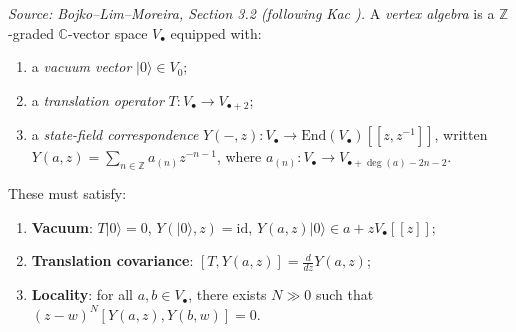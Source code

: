 
\begin{definition}[VertexAlgebra]
  \label{def:vertex-algebra}
  \textit{Source: Bojko--Lim--Moreira, Section 3.2 (following Kac \cite{Ka98}).}
  A \emph{vertex algebra} is a \(\mathbb{Z}\)-graded \(\mathbb{C}\)-vector space
  \(V_\bullet\) equipped with:
  \begin{enumerate}
  \item a \emph{vacuum vector} \(|0\rangle \in V_0\);
  \item a \emph{translation operator} \(T \colon V_\bullet \to V_{\bullet+2}\);
  \item a \emph{state-field correspondence}
        \(Y(-,z) \colon V_\bullet \to \mathrm{End}(V_\bullet)[\![z,z^{-1}]\!]\),
        written \(Y(a,z) = \sum_{n \in \mathbb{Z}} a_{(n)} z^{-n-1}\),
        where \(a_{(n)} \colon V_\bullet \to V_{\bullet + \deg(a) - 2n - 2}\).
  \end{enumerate}
  These must satisfy:
  \begin{enumerate}
  \item \textbf{Vacuum}: \(T|0\rangle = 0\), \(Y(|0\rangle, z) = \mathrm{id}\),
        \(Y(a,z)|0\rangle \in a + z V_\bullet[\![z]\!]\);
  \item \textbf{Translation covariance}: \([T, Y(a,z)] = \tfrac{d}{dz} Y(a,z)\);
  \item \textbf{Locality}: for all \(a, b \in V_\bullet\), there exists \(N \gg 0\)
        such that \((z-w)^N [Y(a,z), Y(b,w)] = 0\).
  \end{enumerate}
\end{definition}

